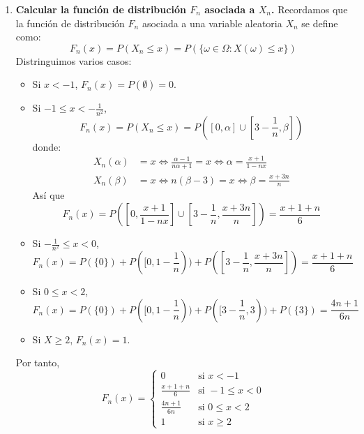 \begin{exercise}
\begin{enumerate}
        \item \textbf{Calcular la función de distribución $F_n$ asociada a $X_n$.}
              Recordamos que la función de distribución $F_n$ asociada a una variable aleatoria $X_n$ se define como:
              $$F_n(x) = P(X_n \leq x) = P(\{ \omega \in \Omega : X(\omega) \leq x \})$$
              Distringuimos varios casos:
              \begin{itemize}
                  \item Si $x < -1$, $F_n(x) = P(\emptyset) = 0$.
                  \item Si $-1 \leq x < -\frac{1}{n^2}$,
                        $$F_n(x) = P(X_n \leq x) = P([0, \alpha] \cup [3-\frac{1}{n}, \beta])$$
                        donde:
                        \begin{align*}
                            X_n(\alpha) & = x \Leftrightarrow \frac{\alpha-1}{n\alpha + 1} = x \Leftrightarrow \alpha = \frac{x+1}{1-nx} \\
                            X_n(\beta)  & = x \Leftrightarrow n(\beta - 3) = x \Leftrightarrow \beta = \frac{x+3n}{n}
                        \end{align*}
                        Así que
                        $$F_n(x) = P([0, \frac{x+1}{1-nx}] \cup [3-\frac{1}{n}, \frac{x+3n}{n}]) = \frac{x+1+n}{6}$$
                  \item Si $-\frac{1}{n^2} \leq x < 0$,
                        $$F_n(x) =  P(\{0\}) + P([0, 1-\frac{1}{n})) + P([3-\frac{1}{n}, \frac{x+3n}{n}]) = \frac{x+1+n}{6}$$
                  \item Si $0 \leq x < 2$,
                        $$F_n(x) =  P(\{0\}) + P([0, 1-\frac{1}{n})) + P([3-\frac{1}{n}, 3)) + P(\{3\}) = \frac{4n+1}{6n}$$
                  \item Si $X \geq 2$, $F_n(x) = 1$.
              \end{itemize}
              Por tanto,
              $$F_n(x) = \begin{cases}
                      0               & \text{si } x < -1        \\
                      \frac{x+1+n}{6} & \text{si } -1 \leq x < 0 \\
                      \frac{4n+1}{6n} & \text{si } 0 \leq x < 2  \\
                      1               & \text{si } x \geq 2
                  \end{cases}$$


\end{enumerate}
\end{exercise}
